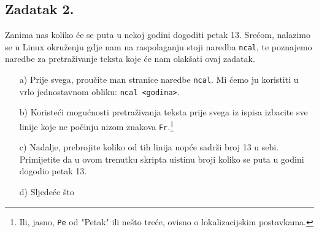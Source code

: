 \documentclass{exam}
\newcommand{\shell}[1]{\texttt{#1}}
\begin{document}
        \subsection*{Zadatak 2.}
            Zanima nas koliko će se puta u nekoj godini dogoditi petak 13.
            Srećom, nalazimo se u Linux okruženju gdje nam na raspolaganju stoji
            naredba \shell{ncal}, te poznajemo naredbe za pretraživanje teksta
            koje će nam olakšati ovaj zadatak. 
                \begin{itemize}
                                \item[a)] Prije svega, proučite man stranice
                                    naredbe \shell{ncal}. Mi ćemo ju koristiti u
                                    vrlo jednostavnom obliku: \shell{ncal
                                    <godina>}.
                                            \item[b)] Koristeći mogućnosti
                                                pretraživanja teksta prije svega
                                                iz ispisa izbacite sve linije
                                                koje ne počinju nizom znakova
                                                \shell{Fr}.\footnote{Ili, jasno,
                                                \shell{Pe} od "Petak" ili nešto
                                                treće, ovisno o lokalizacijskim
                                                postavkama.}
                                                        \item[c)] Nadalje,
                                                            prebrojite koliko od
                                                            tih linija uopće
                                                            sadrži broj 13 u
                                                            sebi. Primijetite da
                                                            u ovom trenutku
                                                            skripta uistinu
                                                            broji koliko se puta
                                                            u godini dogodio
                                                            petak 13.
                                                                    \item[d)]
                                                                        Sljedeće
                                                                        što

\end{itemize}
\end{document}
